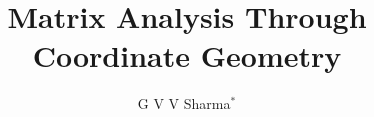 \documentclass[journal,12pt,onecolumn]{IEEEtran}
\begin{document}
\title{
Matrix Analysis Through Coordinate Geometry
}
\author{ G V V Sharma$^{*}$%
\iffalse
	\thanks{*The author is with the Department
		of Electrical Engineering, Indian Institute of Technology, Hyderabad
		502285 India e-mail:  gadepall@iith.ac.in. All content in this manual is released under GNU GPL.  Free and open source.}
		\fi
	
}	


%
%
%

% 
%



% 
\end{document}
